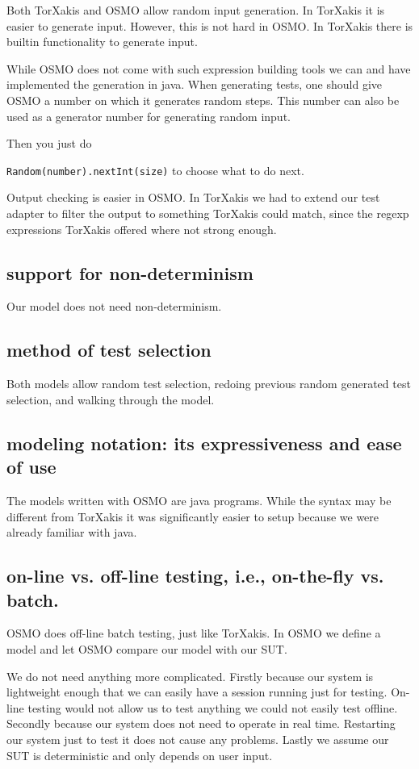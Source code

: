 \documentclass[11pt,a4paper]{article}
\begin{document}
Both TorXakis and OSMO allow random input generation. In TorXakis it
is easier to generate input. However, this is not hard in OSMO. In
TorXakis there is builtin functionality to generate input.

While OSMO does not come with such expression building tools we can
and have implemented the generation in java. When generating tests,
one should give OSMO a number on which it generates random steps. This
number can also be used as a generator number for generating random
input.

Then you just do

\verb|Random(number).nextInt(size)| to choose what to do next.

Output checking is easier in OSMO. In TorXakis we had to extend our
test adapter to filter the output to something TorXakis could match,
since the regexp expressions TorXakis offered where not strong enough.

\subsection{support for non-determinism}
Our model does not need non-determinism.

\subsection{method of test selection}
Both models allow random test selection, redoing previous random
generated test selection, and walking through the model.
\subsection{modeling notation: its expressiveness and ease of use}

The models written with OSMO are java programs. While the syntax may
be different from TorXakis it was significantly easier to setup
because we were already familiar with java.

\subsection{on-line vs. off-line testing, i.e., on-the-fly vs. batch.}

OSMO does off-line batch testing, just like TorXakis. In OSMO we
define a model and let OSMO compare our model with our SUT.

We do not need anything more complicated. Firstly because our system
is lightweight enough that we can easily have a session running just
for testing. On-line testing would not allow us to test anything we
could not easily test offline. Secondly because our system does not
need to operate in real time. Restarting our system just to test it
does not cause any problems. Lastly we assume our SUT is deterministic
and only depends on user input.
\end{document}
